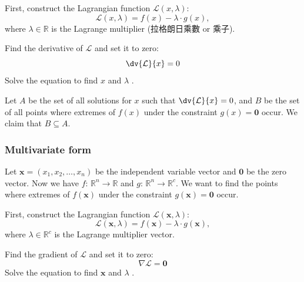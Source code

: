 \documentclass[a4paper,12pt]{report}
\begin{document}
\begin{itemize}
\begin{itemize}
First, construct the Lagrangian function \( \mathcal{L}(x,\lambda) \):
\[\mathcal{L}(x,\lambda) = f(x) - \lambda \cdot g(x),\]
where \( \lambda\in\mathbb{R} \) is the Lagrange multiplier (拉格朗日乘數 or 乘子).

Find the derivative of $\mathcal{L}$ and set it to zero:
\[
\dv{\mathcal{L}}{x} = 0
\]
Solve the equation to find \( x \) and \( \lambda \) . 

 Let $A$ be the set of all solutions for \( x \) such that $\dv{\mathcal{L}}{x} = 0$, and $B$ be the set of all points where extremes of \( f(x) \) under the constraint \( g(x) = \mathbf{0} \) occur. We claim that $B\subseteq A$.
\subsubsection{Multivariate form}
Let \( \mathbf{x} = (x_1, x_2, \dots, x_n) \) be the independent variable vector and $\mathbf{0}$ be the zero vector. Now we have $f:\,\mathbb{R}^n \rightarrow \mathbb{R}$ and $g:\,\mathbb{R}^n \rightarrow \mathbb{R}^c$. We want to find the points where extremes of \( f(\mathbf{x}) \) under the constraint \( g(\mathbf{x}) = \mathbf{0}\) occur. 

First, construct the Lagrangian function \( \mathcal{L}(\mathbf{x},\lambda) \):
\[
\mathcal{L}(\mathbf{x},\lambda) = f(\mathbf{x}) - \lambda \cdot g(\mathbf{x}),
\]
where \( \lambda\in\mathbb{R}^c \) is the Lagrange multiplier vector.

Find the gradient of $\mathcal{L}$ and set it to zero:
\[
\nabla \mathcal{L} = \mathbf{0}
\]
Solve the equation to find \( \mathbf{x} \) and \( \lambda \) . 


\end{itemize}
\end{itemize}
\end{document}
